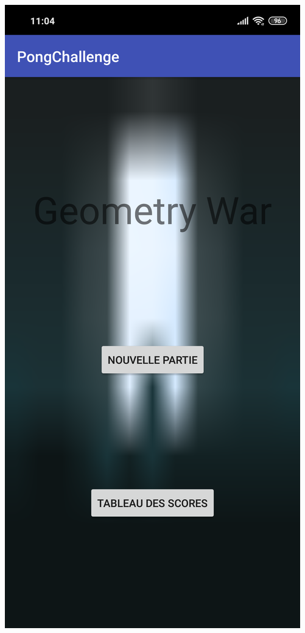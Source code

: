 \documentclass{article}
\begin{document}
\begin{center}
  \includegraphics[scale=0.08]{Main.png}

\end{center}
\end{document}
